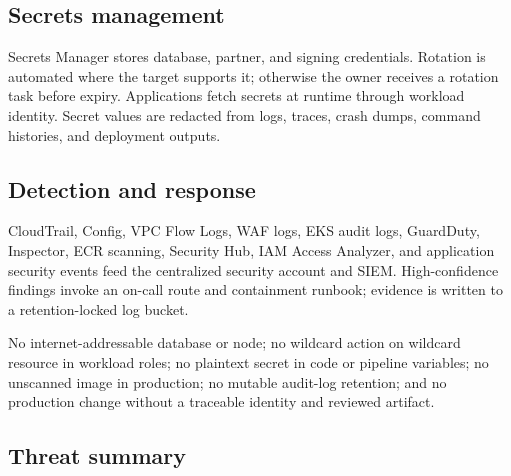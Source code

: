 \subsection{Secrets management}

Secrets Manager stores database, partner, and signing credentials. Rotation is automated where the target supports it; otherwise the owner receives a rotation task before expiry. Applications fetch secrets at runtime through workload identity. Secret values are redacted from logs, traces, crash dumps, command histories, and deployment outputs.

\subsection{Detection and response}

CloudTrail, Config, VPC Flow Logs, WAF logs, EKS audit logs, GuardDuty, Inspector, ECR scanning, Security Hub, IAM Access Analyzer, and application security events feed the centralized security account and SIEM. High-confidence findings invoke an on-call route and containment runbook; evidence is written to a retention-locked log bucket.

\begin{securitybox}
No internet-addressable database or node; no wildcard action on wildcard resource in workload roles; no plaintext secret in code or pipeline variables; no unscanned image in production; no mutable audit-log retention; and no production change without a traceable identity and reviewed artifact.
\end{securitybox}

\subsection{Threat summary}

